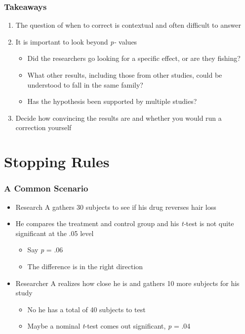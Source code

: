 \documentclass[10pt, block=fill]{beamer}
\begin{document}
\begin{frame}
  \frametitle{Takeaways}
  
  \begin{enumerate}
    \item The question of when to correct is contextual and often difficult to answer
    \item It is important to look beyond \textit{p-} values
    \begin{itemize}
        \item Did the researchers go looking for a specific effect, or are they fishing?
        \item What other results, including those from other studies, could be understood to fall in the same family?
        \item Has the hypothesis been supported by multiple studies?
    \end{itemize}
    \item Decide how convincing the results are and whether you would run a correction yourself
  \end{enumerate}
    
\end{frame}


\section{Stopping Rules}

\begin{frame}
  \frametitle{A Common Scenario}

  \begin{itemize}
    \item Research A gathers 30 subjects to see if his drug reverses hair loss
    \item He compares the treatment and control group and his \textit{t-}test is not quite significant at the .05 level
    \begin{itemize}
      \item Say \textit{p} = .06
      \item The difference is in the right direction
    \end{itemize}
    \item Researcher A realizes how close he is and gathers 10 more subjects for his study
    \begin{itemize}
      \item No he has a total of 40 subjects to test
      \item Maybe a nominal \textit{t}-test comes out significant, \textit{p} = .04
    \end{itemize}
  \end{itemize}
\end{frame}
\end{document}
